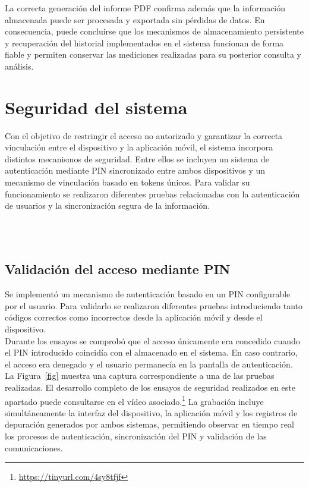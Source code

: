 La correcta generación del informe PDF confirma además que la información almacenada puede ser procesada y exportada sin pérdidas de datos. En consecuencia, puede concluirse que los mecanismos de almacenamiento persistente y recuperación del historial implementados en el sistema funcionan de forma fiable y permiten conservar las mediciones realizadas para su posterior consulta y análisis.

\section{Seguridad del sistema}

Con el objetivo de restringir el acceso no autorizado y garantizar la correcta vinculación entre el dispositivo y la aplicación móvil, el sistema incorpora distintos mecanismos de seguridad. Entre ellos se incluyen un sistema de autenticación mediante PIN sincronizado entre ambos dispositivos y un mecanismo de vinculación basado en tokens únicos. Para validar su funcionamiento se realizaron diferentes pruebas relacionadas con la autenticación de usuarios y la sincronización segura de la información.\\

\

\

\subsection{Validación del acceso mediante PIN}

Se implementó un mecanismo de autenticación basado en un PIN configurable por el usuario. Para validarlo se realizaron diferentes pruebas introduciendo tanto códigos correctos como incorrectos desde la aplicación móvil y desde el dispositivo.\\

Durante los ensayos se comprobó que el acceso únicamente era concedido cuando el PIN introducido coincidía con el almacenado en el sistema. En caso contrario, el acceso era denegado y el usuario permanecía en la pantalla de autenticación.\\

La Figura~\ref{fig} muestra una captura correspondiente a una de las pruebas realizadas. El desarrollo completo de los ensayos de seguridad realizados en este apartado puede consultarse en el vídeo asociado.\footnote{\url{https://tinyurl.com/4sy8tfjf}} La grabación incluye simultáneamente la interfaz del dispositivo, la aplicación móvil y los registros de depuración generados por ambos sistemas, permitiendo observar en tiempo real los procesos de autenticación, sincronización del PIN y validación de las comunicaciones.

